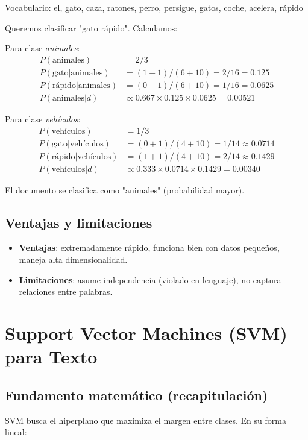 \documentclass[12pt,a4paper,openany,oneside]{book}
\begin{document}
Vocabulario: el, gato, caza, ratones, perro, persigue, gatos, coche, acelera, rápido

Queremos clasificar "gato rápido". Calculamos:

Para clase \textit{animales}:
\begin{align*}
P(\text{animales}) &= 2/3 \\
P(\text{gato}|\text{animales}) &= (1+1)/(6+10) = 2/16 = 0.125 \\
P(\text{rápido}|\text{animales}) &= (0+1)/(6+10) = 1/16 = 0.0625 \\
P(\text{animales}|d) &\propto 0.667 \times 0.125 \times 0.0625 = 0.00521
\end{align*}

Para clase \textit{vehículos}:
\begin{align*}
P(\text{vehículos}) &= 1/3 \\
P(\text{gato}|\text{vehículos}) &= (0+1)/(4+10) = 1/14 \approx 0.0714 \\
P(\text{rápido}|\text{vehículos}) &= (1+1)/(4+10) = 2/14 \approx 0.1429 \\
P(\text{vehículos}|d) &\propto 0.333 \times 0.0714 \times 0.1429 = 0.00340
\end{align*}

El documento se clasifica como "animales" (probabilidad mayor).

\subsection{Ventajas y limitaciones}
\begin{itemize}
    \item \textbf{Ventajas}: extremadamente rápido, funciona bien con datos pequeños, maneja alta dimensionalidad.
    \item \textbf{Limitaciones}: asume independencia (violado en lenguaje), no captura relaciones entre palabras.
\end{itemize}

\section{Support Vector Machines (SVM) para Texto}

\subsection{Fundamento matemático (recapitulación)}
SVM busca el hiperplano que maximiza el margen entre clases. En su forma lineal:
\end{document}
